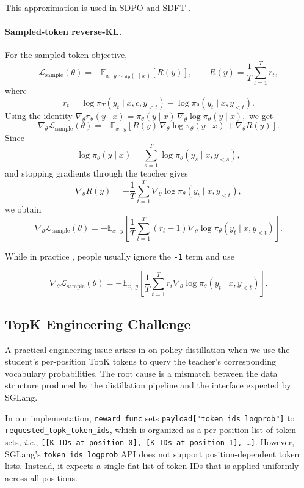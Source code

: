 This approximation is used in SDPO \cite{hubotter2026reinforcementlearningselfdistillation} and SDFT \cite{shenfeld2026selfdistillationenablescontinuallearning}.

\paragraph{Sampled-token reverse-KL.}
For the sampled-token objective,
\[
\mathcal{L}_{\mathrm{sample}}(\theta)
=
-
\mathbb{E}_{x,\; y\sim \pi_\theta(\cdot\mid x)}
\left[
R(y)
\right],
\qquad
R(y)=\frac{1}{T}\sum_{t=1}^T r_t,
\]
where
\[
r_t
=
\log \pi_T(y_t\mid x,c,y_{<t})
-
\log \pi_\theta(y_t\mid x,y_{<t}).
\]
Using the identity
$
\nabla_\theta \pi_\theta(y\mid x)
=
\pi_\theta(y\mid x)\,\nabla_\theta \log \pi_\theta(y\mid x),
$ we get 
\[
\nabla_\theta \mathcal{L}_{\mathrm{sample}}(\theta)
=
-
\mathbb{E}_{x,\; y}
\left[
R(y)\,\nabla_\theta \log \pi_\theta(y\mid x)
+
\nabla_\theta R(y)
\right].
\]
Since
\[
\log \pi_\theta(y\mid x)
=
\sum_{s=1}^T \log \pi_\theta(y_s\mid x,y_{<s}),
\]
and stopping gradients through the teacher gives
\[
\nabla_\theta R(y)
=
-\frac{1}{T}\sum_{t=1}^T
\nabla_\theta \log \pi_\theta(y_t\mid x,y_{<t}),
\]
we obtain
\[
\nabla_\theta \mathcal{L}_{\mathrm{sample}}(\theta)
=
-
\mathbb{E}_{x,\; y}
\left[
\frac{1}{T}\sum_{t=1}^T
\left(
r_t-1
\right)
\nabla_\theta \log \pi_\theta(y_t\mid x,y_{<t})
\right].
\]

While in practice \cite{zhao2026selfdistilledreasoneronpolicyselfdistillation}, people usually ignore the \texttt{-1} term and use

\[
\nabla_\theta \mathcal{L}_{\mathrm{sample}}(\theta)
=
-
\mathbb{E}_{x,\; y}
\left[
\frac{1}{T}\sum_{t=1}^T
r_t
\nabla_\theta \log \pi_\theta(y_t\mid x,y_{<t})
\right].
\]



\subsection{TopK Engineering Challenge}
\label{topkchallenge}
A practical engineering issue arises in on-policy distillation when we use the student's per-position TopK tokens to query the teacher's corresponding vocabulary probabilities. The root cause is a mismatch between the data structure produced by the distillation pipeline and the interface expected by SGLang.

In our implementation, \texttt{reward\_func} sets \texttt{payload["token\_ids\_logprob"]} to \texttt{requested\_topk\_token\_ids}, which is organized as a per-position list of token sets, \emph{i.e.}, \texttt{[[K IDs at position 0], [K IDs at position 1], \dots]}. However, SGLang's \texttt{token\_ids\_logprob} API does not support position-dependent token lists. Instead, it expects a single flat list of token IDs that is applied uniformly across all positions.

